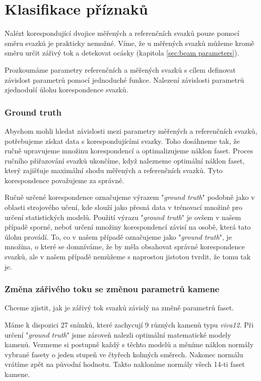 \part{Klasifikace příznaků}

Nalézt korespondující dvojice měřených a referenčních svazků pouze pomocí směru svazků je prakticky nemožné. Víme, že u měřených svazků můžeme kromě směru určit zářivý tok a detekovat ocásky (kapitola \ref{sec:beam parameters}).   

Prozkoumáme parametry referenčních a měřených svazků s cílem definovat závislost parametrů pomocí jednoduché funkce. Nalezení závislosti parametrů zjednoduší úlohu korespondence svazků.  


\section{Ground truth}

Abychom mohli hledat závislosti mezi parametry měřených a referenčních svazků, potřebujeme získat data  s korespondujícími svazky. Toho dosáhneme tak, že ručně upravujeme množinu korespondencí a optimalizujeme náklon faset. Proces ručního přiřazování svazků ukončíme, když nalezneme optimální náklon faset, který zajišťuje maximální shodu měřených a referenčních svazků. Tyto korespondence považujeme za správné.    

Ručně určené korespondence označujeme výrazem "\textit{ground truth}" podobně jako v oblasti strojového učení, kde slouží jako přesná data v trénovací množině pro určení statistických modelů. Použití výrazu "\textit{ground truth}" je ovšem v našem případě sporné, neboť určení množiny korespondencí závisí na osobě, která tato úlohu provádí. To, co v našem případě označujeme jako "\textit{ground truth}", je množina, o které se domníváme, že by měla obsahovat správné korespondence svazků, ale v našem případě nemůžeme s naprostou jistotou tvrdit, že tomu tak je. 

\section{Změna zářivého toku se změnou parametrů kamene}
\label{sec: zmena_tok }

	Chceme zjistit, jak je zářivý tok svazků závislý na změně parametrů faset. 

	Máme k dispozici 27 snímků, které zachycují 9 různých kamenů typu \textit{viva12}. Při určení "\textit{ground truth}" jsme zároveň nalezli optimální matematické modely kamenů. Vezmeme si postupně každý s těchto modelů a měníme náklon normály vybrané fasety o jeden stupeň ve čtyřech kolmých směrech. Nakonec normálu vrátíme zpět na původní hodnotu. Takto nakloníme normály všech 14-ti faset kamene.
	
